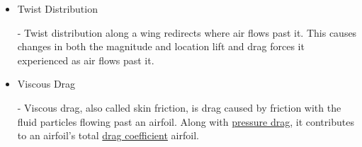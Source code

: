 \documentclass{article}
\begin{document}
\begin{itemize}
	\item \hypertarget{T}{Twist Distribution} - Twist distribution along a wing redirects where air flows past it. This causes changes in both the magnitude and location lift and drag forces it experienced as air flows past it.
	
	\item \hypertarget{VD}{Viscous Drag} - Viscous drag, also called skin friction, is drag caused by friction with the fluid particles flowing past an airfoil. Along with \hyperlink{PD}{pressure drag}, it contributes to an airfoil's total \hyperlink{CD}{drag coefficient} airfoil.
	
\end{itemize}
\end{document}
